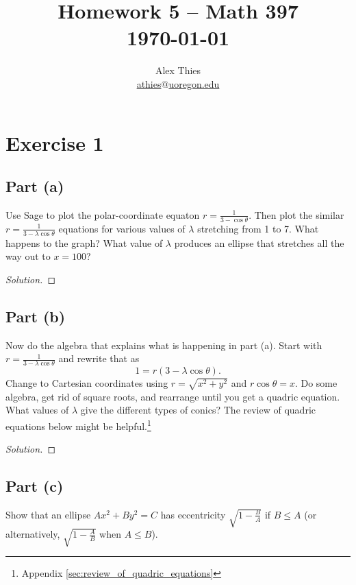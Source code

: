 \documentclass[letterpaper, 12pt]{amsart}
\theoremstyle{definition}  							%
\begin{document}
	\title{Homework 5  -- Math 397 \\ \today}
	\author{Alex Thies \\ \href{mailto:athies@uoregon.edu}{\lowercase{athies$@$uoregon.edu}}}

	\maketitle

	\section*{Exercise 1}
		\subsection*{Part (a)}
		Use Sage to plot the polar-coordinate equaton $r = \tfrac{1}{3-\cos\theta}$. 
		Then plot the similar $r = \tfrac{1}{3-\lambda\cos\theta}$ equations for various values of $\lambda$ stretching from 1 to 7. 
		What happens to the graph? 
		What value of $\lambda$ produces an ellipse that stretches all the way out to $x = 100$?

		\begin{proof}[Solution]
		\end{proof}

		\subsection*{Part (b)}
		Now do the algebra that explains what is happening in part (a). 
		Start with $r = \tfrac{1}{3-\lambda\cos\theta}$ and rewrite that as $$1 = r(3-\lambda\cos\theta).$$
		Change to Cartesian coordinates using $r = \sqrt{x^2 + y^2}$ and $r \cos\theta = x$. 
		Do some algebra, get rid of square roots, and rearrange until you get a quadric equation. 
		What values of $\lambda$ give the different types of conics? 
		The review of quadric equations below might be helpful.\footnote{Appendix \ref{sec:review_of_quadric_equations}}

		\begin{proof}[Solution]
		\end{proof}

		\subsection*{Part (c)}
		Show that an ellipse $Ax^2 + By^2 = C$ has eccentricity $\sqrt{1 - \tfrac{B}{A}}$ if $B \leq A$ (or alternatively, $\sqrt{1 - \tfrac{A}{B}}$ when $A \leq B$).
\end{document}
